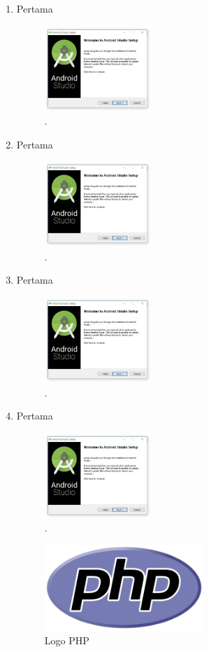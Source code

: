 \begin{enumerate}
	\item Pertama
	\begin{figure}[H]
		\includegraphics[width=4cm]{figures/installas/1.jpg}
		\centering
		\caption{.}
	\end{figure}
	
	\item Pertama
	\begin{figure}[H]
		\includegraphics[width=4cm]{figures/installas/1.jpg}
		\centering
		\caption{.}
	\end{figure}
	
	\item Pertama
	\begin{figure}[H]
		\includegraphics[width=4cm]{figures/installas/1.jpg}
		\centering
		\caption{.}
	\end{figure}
	
	\item Pertama
	\begin{figure}[H]
		\includegraphics[width=4cm]{figures/installas/1.jpg}
		\centering
		\caption{.}
	\end{figure}
	\begin{figure}[H]
		\includegraphics[width=6cm]{figures/web/php.png}
		\centering
		\caption{Logo PHP}
	\end{figure}



\end{enumerate}
